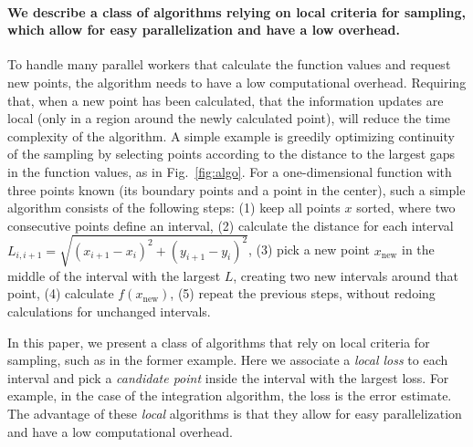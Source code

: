 \hypertarget{we-describe-a-class-of-algorithms-relying-on-local-criteria-for-sampling-which-allow-for-easy-parallelization-and-have-a-low-overhead.}{%
\paragraph{We describe a class of algorithms relying on local criteria for sampling, which allow for easy parallelization and have a low overhead.}\label{we-describe-a-class-of-algorithms-relying-on-local-criteria-for-sampling-which-allow-for-easy-parallelization-and-have-a-low-overhead.}}

To handle many parallel workers that calculate the function values and request new points, the algorithm needs to have a low computational overhead.
Requiring that, when a new point has been calculated, that the information updates are local (only in a region around the newly calculated point), will reduce the time complexity of the algorithm.
A simple example is greedily optimizing continuity of the sampling by selecting points according to the distance to the largest gaps in the function values, as in Fig.~\ref{fig:algo}.
For a one-dimensional function with three points known (its boundary points and a point in the center), such a simple algorithm consists of the following steps:
(1) keep all points $x$ sorted, where two consecutive points define an interval,
(2) calculate the distance for each interval $L_{i, i+1}=\sqrt{(x_{i+1}-x_{i})^{2}+(y_{i+1}-y_{i})^{2}}$,
(3) pick a new point $x_\textrm{new}$ in the middle of the interval with the largest $L$, creating two new intervals around that point,
(4) calculate $f(x_\textrm{new})$,
(5) repeat the previous steps, without redoing calculations for unchanged intervals.

In this paper, we present a class of algorithms that rely on local criteria for sampling, such as in the former example.
Here we associate a \emph{local loss} to each interval and pick a \emph{candidate point} inside the interval with the largest loss.
For example, in the case of the integration algorithm, the loss is the error estimate.
The advantage of these \emph{local} algorithms is that they allow for easy parallelization and have a low computational overhead.

